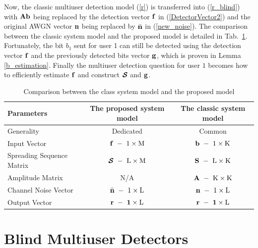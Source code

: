 \documentclass[a4paper,11pt,fleqn]{article}
\newcommand{\bA}{{\mathbf A}}
\newcommand{\bb}{{\bf b}}
\newcommand{\bg}{{\bf g}}
\newcommand{\bn}{{\bf n}}
\newcommand{\bbf}{{\bf f}}
\newcommand{\bS}{{\bf S}}
\newcommand{\bcS}{{\mbox {\boldmath ${\cal S}$}}}
\begin{document}
Now, the classic multiuser detection model (\ref{r}) is
transferred into (\ref{r_blind}) with $\bA\bb$ being replaced by
the detection vector $\bbf$ in (\ref{DetectorVector2}) and the
original AWGN vector $\bn$ being replaced by $\bar{\bn}$ in
(\ref{new_noise}). The comparison between the classic system model
and the proposed model is detailed in Tab.~\ref{ModelComp}.
Fortunately, the bit $b_1$ sent for user 1 can still be detected
using the detection vector $\bbf$ and the previously detected bits
vector $\bg$, which is proven in  Lemma \ref{b_estimation}.
Finally the multiuser detection question for user $1$ becomes how
to efficiently estimate $\bbf$ and construct $\bcS$ and $\bg$.


\begin{table}
\caption{Comparison between the class system model and the
proposed model}\label{ModelComp}
\begin{center}
\begin{tabular}{lcc}
Parameters&The proposed system model&The classic system model\\
\hline
Generality& Dedicated& Common\\
Input Vector &$\bbf\ -\ 1\times\rm M$&$\bb\ -\ 1\times\rm K$\\
Spreading Sequence Matrix &$\bcS\ -\ \rm L\times\rm M$&$\bS\ -\ \rm L\times\rm K$\\
Amplitude Matrix & N/A &$\bf{A}\ -\ \rm K\times\rm K$\\
Channel Noise Vector &$\bar\bn\ -\ 1\times\rm L$&$\bn\ -\ 1\times\rm L$\\
Output Vector&$\bf{r}\ -\ 1\times\rm L$&$\bf{r}\ -\ 1\times\rm L$\\
 \hline
\end{tabular}
\end{center}
\end{table}

\pagebreak


\section{Blind Multiuser Detectors\label{LBD}}
\end{document}
